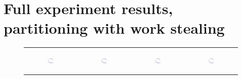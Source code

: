 ~\newpage\section{Full experiment results,  partitioning with work stealing}
\label{app:exptresults_partition}
\begin{figure}[ht]
  \centering
  \begin{tabular}{cccc}
	  \begin{subfigure}[b]{0.22\textwidth}
	  	\includegraphics[width=110pt]{images_partition/runtime_erdosrenyi_maxgraphcut.pdf}
			\caption{}
			\label{appfig:partition:runtime_erdosrenyi_maxgraphcut}
	  \end{subfigure} &
	  \begin{subfigure}[b]{0.22\textwidth}
	  	\includegraphics[width=110pt]{images_partition/runtime_erdosrenyi_setcover.pdf}
			\caption{}
			\label{appfig:partition:runtime_erdosrenyi_setcover}
	  \end{subfigure} &
	  \begin{subfigure}[b]{0.22\textwidth}
	  	\includegraphics[width=110pt]{images_partition/runtime_zigzag_maxgraphcut.pdf}
			\caption{}
			\label{appfig:partition:runtime_zigzag_maxgraphcut}
	  \end{subfigure} &
	  \begin{subfigure}[b]{0.22\textwidth}
	  	\includegraphics[width=110pt]{images_partition/runtime_zigzag_setcover.pdf}

\end{subfigure}
\end{tabular}
\end{figure}
